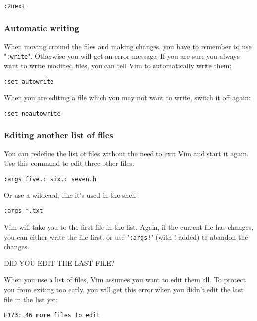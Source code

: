  \begin{Verbatim}[samepage=true]
 :2next
 \end{Verbatim}

\subsubsection{Automatic writing}
When moving around the files and making changes, you have to remember to use "\texttt{:write}".
Otherwise you will get an error message.
If you are sure you always want to write modified files, you can tell Vim to automatically write them:

 \begin{Verbatim}[samepage=true]
 :set autowrite
 \end{Verbatim}

When you are editing a file which you may not want to write, switch it off again:

 \begin{Verbatim}[samepage=true]
 :set noautowrite
 \end{Verbatim}

\subsubsection{Editing another list of files}
You can redefine the list of files without the need to exit Vim and start it again.
Use this command to edit three other files:

 \begin{Verbatim}[samepage=true]
 :args five.c six.c seven.h
 \end{Verbatim}

Or use a wildcard, like it's used in the shell:

 \begin{Verbatim}[samepage=true]
 :args *.txt
 \end{Verbatim}

Vim will take you to the first file in the list.
Again, if the current file has changes, you can either write the file first, or use "\texttt{:args!}" (with ! added) to abandon the changes.

DID YOU EDIT THE LAST FILE?
\label{arglist-quit}

When you use a list of files, Vim assumes you want to edit them all.
To protect you from exiting too early, you will get this error when you didn't edit the last file in the list yet:

		\begin{Verbatim}[samepage=true]
    E173: 46 more files to edit 
						\end{Verbatim}

